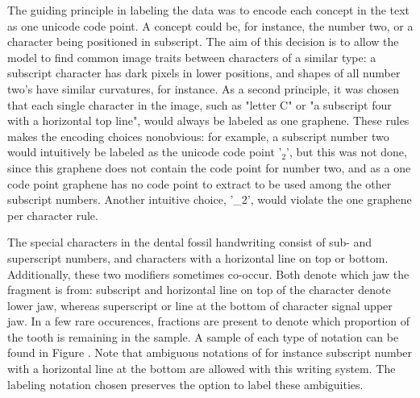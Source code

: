 \documentclass{article}
\begin{document}
The guiding principle in labeling the data was to encode each concept in the text as one unicode code point. A concept could be, for 
instance, the number two, or a character being positioned in subscript. The aim of this decision is to allow the model 
to find common image traits between characters of a similar type: a subscript character has dark pixels in lower positions, and shapes of all 
number two's have similar curvatures, for instance. As a second principle, it was chosen that each single character in the image, such as "letter C" 
or "a subscript four with a horizontal top line", would always be labeled as one graphene. 
These rules makes the encoding choices nonobvious: for example, 
a subscript number two would intuitively be labeled as the unicode code point '$_2$', but this was not done, 
since this graphene does not contain the code point for number two, 
and as a one code point graphene has no code point to extract to be used among the other subscript numbers.
Another intuitive choice, '\_2', would violate the one graphene per character rule.

The special characters in the dental fossil handwriting consist of sub- and superscript numbers, and characters with a horizontal line on 
top or bottom. Additionally, these two modifiers sometimes co-occur. Both denote which jaw the fragment is from: 
subscript and horizontal line on top of the character denote lower jaw, whereas superscript or line at the bottom of character 
signal upper jaw. In a few rare occurences, fractions are present 
to denote which proportion of the tooth is remaining in the sample. A sample of each type of notation can be found in Figure .
Note that ambiguous notations of for instance subscript number with a horizontal line at the bottom are allowed with this writing system.
The labeling notation chosen preserves the option to label these ambiguities.

\end{document}
